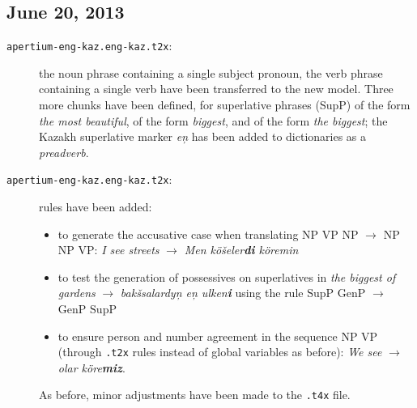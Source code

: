\documentclass{article}
\begin{document}
\subsection{June 20, 2013}
\begin{description}
\item[\texttt{apertium-eng-kaz.eng-kaz.t2x}:] the noun phrase containing a single subject pronoun, the verb phrase containing a single verb have been transferred to the new model. Three more chunks have been defined, for superlative phrases (SupP) of the form \emph{the most beautiful}, of the form \emph{biggest}, and of the form \emph{the biggest}; the Kazakh superlative marker \emph{e\c{n}} has been added to dictionaries as a \emph{preadverb}.
\item[\texttt{apertium-eng-kaz.eng-kaz.t2x}:] rules have been added: 
  \begin{itemize}
  \item to generate the accusative case when translating \(\mathrm{NP}\) \(\mathrm{VP}\) \(\mathrm{NP}\) \(\to\) \(\mathrm{NP}\) \(\mathrm{NP}\) \(\mathrm{VP}\): \emph{I see streets} \(\to\) \emph{Men kö\v{s}eler\textbf{di} köremin}
  \item to test the generation of possessives on superlatives in \emph{the biggest of gardens} \(\to\) \emph{bak\v{s}salardy\c{n} e\c{n} ulken\textbf{i}} using the rule \(\mathrm{SupP}\) \(\mathrm{GenP}\) \(\to\) \(\mathrm{GenP}\)  \(\mathrm{SupP}\)
  \item to ensure person and number agreement in the sequence  \(\mathrm{NP}\)  \(\mathrm{VP}\) (through \texttt{.t2x} rules instead of global variables as before): \emph{We see} \(\to\) \emph{olar köre\textbf{miz}}.
  \end{itemize}
As before, minor adjustments have been made to the \texttt{.t4x} file. 

\end{description}
\end{document}

